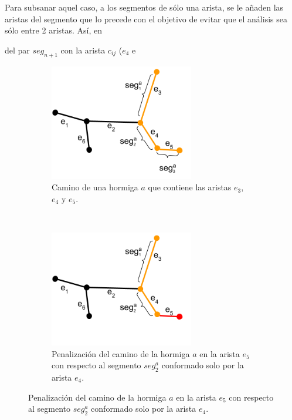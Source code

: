 Para subsanar aquel caso, a los segmentos de s\'olo una arista, se le a\~naden las aristas del segmento que lo precede con el objetivo de evitar que el an\'alisis sea s\'olo entre 2 aristas. As\'i, en 

del par $seg_{n+1}$ con la arista $c_{ij}$ ($e_4$ e

 \begin{figure}[h]
    \centering
    \begin{subfigure}[t]{0.48\textwidth}
        \centering
        \includegraphics[height=2in]{imagenes/ant_segments_complex_case_B1.png}
        \caption{Camino de una hormiga $a$ que contiene las aristas $e_3$, $e_4$ y $e_5$.}
        \label{fig:segmentComplexCaseB1}
    \end{subfigure}%
    ~ \hspace{0.5cm}
    \begin{subfigure}[t]{0.48\textwidth}
        \centering
        \includegraphics[height=2in]{imagenes/ant_segments_complex_case_B2.png}
        \caption{Penalizaci\'on del camino de la hormiga $a$ en la arista $e_5$ con respecto al segmento $seg^{a}_2$ conformado solo por la arista $e_4$.}
        \label{fig:segmentComplexCaseB2}
    \end{subfigure}


\end{figure}

